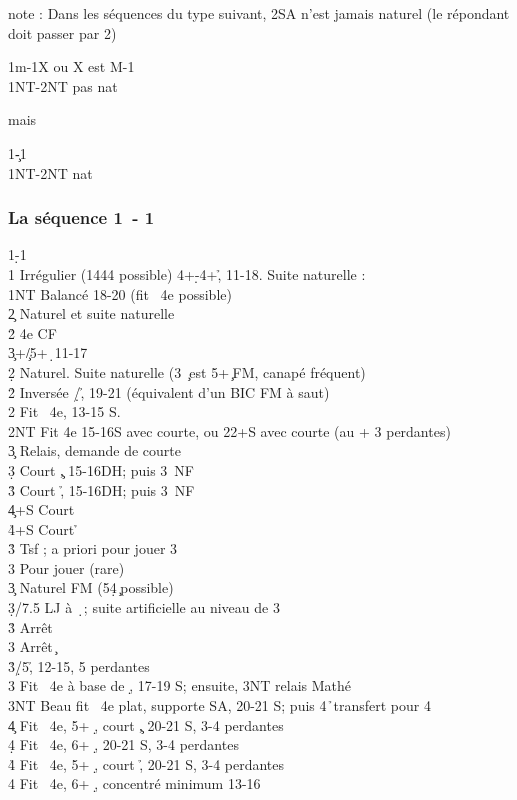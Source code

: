 \documentclass[a4paper]{article}
\begin{document}
note :	Dans les séquences du type suivant, 2SA n’est jamais naturel (le répondant doit passer par 2\s )

\begin{bidtable}
1m-1X \> ou X est M-1\\
1NT-2NT \> pas nat
\end{bidtable}

mais

\begin{bidtable}
1\c-1\d\\
1NT-2NT \> nat
\end{bidtable}

\subsubsection{La séquence 1\pdfd\ - 1\pdfh}

\begin{bidtable}
1\d-1\h\\
1\s \> Irrégulier (1444 possible) 4+\d -4+\h , 11-18. Suite naturelle :\\
1NT \> Balancé 18-20 (fit \s\ 4e possible)\\
2\c \> Naturel et suite naturelle\+\\
2\h \> 4e CF\+\\
3\c {}+\c /5+\d\ 11-17\-\-\\
2\d \> Naturel. Suite naturelle (3 \c\ est 5+\c\ FM, canapé fréquent)\\
2\h \> Inversée \d /\h , 19-21 (équivalent d'un BIC FM à saut)\\
2\s \> Fit \s\ 4e, 13-15 S.\\
2NT \> Fit 4e 15-16S avec courte, ou 22+S avec courte (au + 3 perdantes)\+\\
3\c \> Relais, demande de courte\+\\
3\d \> Court \c , 15-16DH; puis 3\s\ NF\\
3\h \> Court \h , 15-16DH; puis 3\s\ NF\\
4\c {}+S Court \c \\
4\h {}+S Court \h \-\\
3\h \> Tsf \s ; a priori pour jouer 3\s \\
3\s \> Pour jouer (rare)\-\\
3\c \> Naturel FM (5\d 4\c\ possible)\\
3\d {}/7.5 LJ à \d\ ; suite artificielle au niveau de 3\+\\
3\h \> Arrêt \h \\
3\s \> Arrêt \c \-\\
3\h {}\d /5\h , 12-15, 5 perdantes\\
3\s \> Fit \s\ 4e à base de \d , 17-19 S; ensuite, 3NT relais Mathé\\
3NT \> Beau fit \s\ 4e plat, supporte SA, 20-21 S; puis 4\h\ transfert pour 4\s \\
4\c \> Fit \s\ 4e, 5+ \d , court \c , 20-21 S, 3-4 perdantes\\
4\d \> Fit \s\ 4e, 6+ \d , 20-21 S, 3-4 perdantes\\
4\h \> Fit \s\ 4e, 5+ \d , court \h , 20-21 S, 3-4 perdantes\\
4\s \> Fit \s\ 4e, 6+ \d , concentré minimum 13-16
\end{bidtable}
\end{document}
